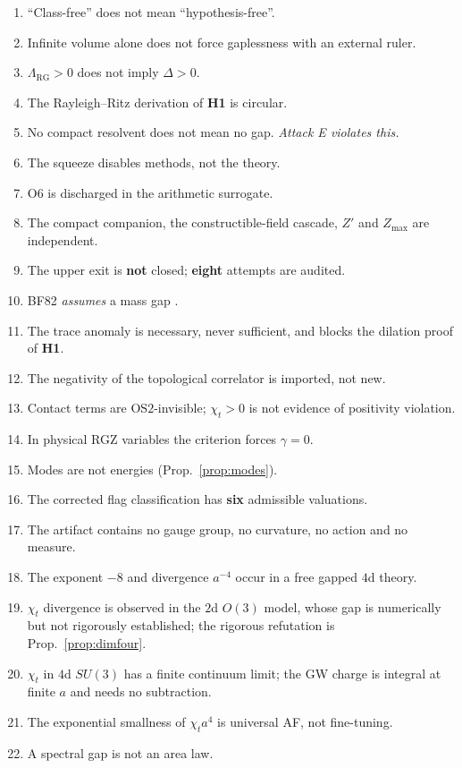 \documentclass[11pt,a4paper]{article}
\theoremstyle{plain}
\theoremstyle{definition}
\theoremstyle{remark}
\newcommand{\OS}{\mathrm{OS}}\newcommand{\Gap}{\mathrm{Gap}}
\newcommand{\Chit}{\chi_t}
\renewcommand{\_}{\oldunderscore\allowbreak}
\begin{document}
\begin{enumerate}[label=\textbf{I\arabic*.},leftmargin=30pt,itemsep=1pt]
the admissibility predicate.
\item ``Class-free'' does not mean ``hypothesis-free''.
\item Infinite volume alone does not force gaplessness with an external ruler.
\item $\Lambda_{\mathrm{RG}}>0$ does not imply $\Delta>0$.
\item The Rayleigh--Ritz derivation of \textbf{H1} is circular.
\item No compact resolvent does not mean no gap. \emph{Attack E violates this.}
\item The squeeze disables methods, not the theory.
\item O6 is discharged in the arithmetic surrogate.
\item The compact companion, the constructible-field cascade, $Z'$ and $Z_{\max}$ are independent.
\item The upper exit is \textbf{not} closed; \textbf{eight} attempts are audited.
\item BF82 \emph{assumes} a mass gap \cite{BF1982}.
\item The trace anomaly is necessary, never sufficient, and blocks the dilation proof of
\textbf{H1}.
\item The negativity of the topological correlator is imported, not new.
\item Contact terms are $\OS2$-invisible; $\Chit>0$ is not evidence of positivity violation.
\item In physical RGZ variables the criterion forces $\gamma=0$.
\item Modes are not energies (Prop.~\ref{prop:modes}).
\item The corrected flag classification has \textbf{six} admissible valuations.
\item The artifact contains no gauge group, no curvature, no action and no measure.
\item The exponent $-8$ and divergence $a^{-4}$ occur in a free gapped $4$d theory.
\item $\Chit$ divergence is observed in the $2$d $O(3)$ model, whose gap is numerically but not
rigorously established; the rigorous refutation is Prop.~\ref{prop:dimfour}.
\item $\Chit$ in $4$d $SU(3)$ has a finite continuum limit; the GW charge is integral at finite
$a$ and needs no subtraction.
\item The exponential smallness of $\Chit a^4$ is universal AF, not fine-tuning.
\item A spectral gap is not an area law.

\end{enumerate}
\end{document}
